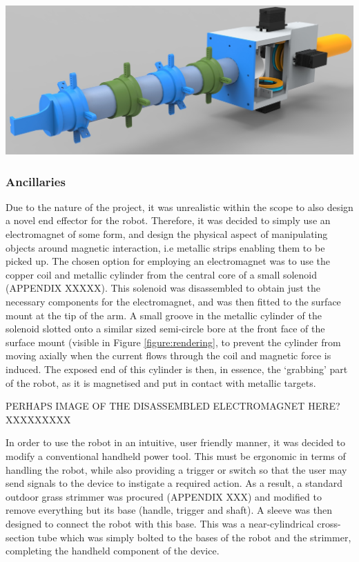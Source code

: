 \documentclass[11pt]{article}
\begin{document}
\begin{center}
\includegraphics[width=\textwidth]{images/rendering.png}
\label{figure:rendering}
\end{center}

\subsubsection{Ancillaries}
Due to the nature of the project, it was unrealistic within the scope to also design a novel end effector for the robot. Therefore, it was decided to simply use an electromagnet of some form, and design the physical aspect of manipulating objects around magnetic interaction, i.e metallic strips enabling them to be picked up. The chosen option for employing an electromagnet was to use the copper coil and metallic cylinder from the central core of a small solenoid (APPENDIX XXXXX). This solenoid was disassembled to obtain just the necessary components for the electromagnet, and was then fitted to the surface mount at the tip of the arm. A small groove in the metallic cylinder of the solenoid slotted onto a similar sized semi-circle bore at the front face of the surface mount (visible in Figure \ref{figure:rendering}, to prevent the cylinder from moving axially when the current flows through the coil and magnetic force is induced. The exposed end of this cylinder is then, in essence, the `grabbing' part of the robot, as it is magnetised and put in contact with metallic targets.

PERHAPS IMAGE OF THE DISASSEMBLED ELECTROMAGNET HERE? XXXXXXXXX

In order to use the robot in an intuitive, user friendly manner, it was decided to modify a conventional handheld power tool. This must be ergonomic in terms of handling the robot, while also providing a trigger or switch so that the user may send signals to the device to instigate a required action. As a result, a standard outdoor grass strimmer was procured (APPENDIX XXX) and modified to remove everything but its base (handle, trigger and shaft). A sleeve was then designed to connect the robot with this base. This was a near-cylindrical cross-section tube which was simply bolted to the bases of the robot and the strimmer, completing the handheld component of the device.
\end{document}
